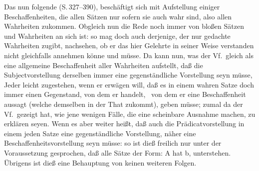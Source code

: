 Das nun folgende  (S.\,327--390), beschäftigt sich mit Aufstellung einiger Beschaffenheiten, die allen Sätzen nur sofern sie auch wahr sind, also allen Wahrheiten zukommen. Obgleich nun die Rede noch immer von bloßen Sätzen und Wahrheiten an sich ist: so mag doch auch derjenige, der nur gedachte Wahrheiten zugibt, nachsehen, ob er das hier Gelehrte in seiner Weise verstanden nicht gleichfalls annehmen könne und müsse. Da kann nun, was der Vf.\ gleich  als eine allgemeine Beschaffenheit aller Wahrheiten aufstellt, daß die Subjectvorstellung derselben immer eine gegenständliche Vorstellung seyn müsse, Jeder leicht zugestehen, wenn er erwägen will, daß es in einem wahren Satze doch immer einen Gegenstand, von dem er handelt, \dh\  von dem er eine Beschaffenheit aussagt (welche demselben in der That zukommt), geben müsse; zumal da der Vf.\ gezeigt hat, wie jene wenigen Fälle, die eine scheinbare Ausnahme machen, zu erklären seyen. Wenn es aber weiter heißt, daß auch die Prädicatvorstellung in einem jeden Satze eine gegenständliche Vorstellung, näher eine Beschaffenheitsvorstellung seyn müsse: so ist dieß freilich nur unter der Voraussetzung gesprochen, daß alle Sätze der Form: A hat b, unterstehen. Übrigens ist dieß eine Behauptung von keinen weiteren Folgen. \par
